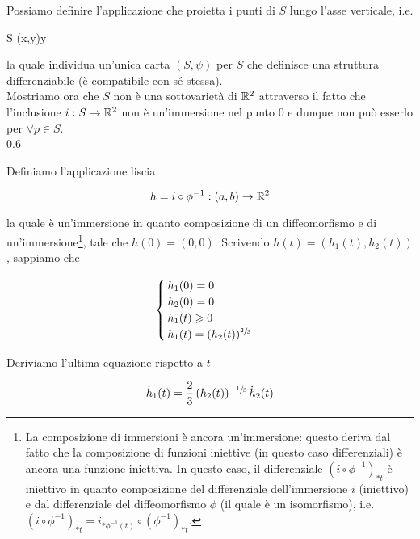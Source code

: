Possiamo definire l'applicazione che proietta i punti di $ S $ lungo l'asse verticale, i.e.

\map{\psi}
	{S}{\R}
	{(x,y)}{y}

la quale individua un'unica carta $ (S,\psi) $ per $ S $ che definisce una struttura differenziabile (è compatibile con sé stessa).\\
Mostriamo ora che $ S $ non è una sottovarietà di $ \mathbb{R}^{2} $ attraverso il fatto che l'inclusione $ i : S \to \mathbb{R}^{2} $ non è un'immersione nel punto 0 e dunque non può esserlo per $ \forall p \in S $.\\

	{0.6}{%
			}

Definiamo l'applicazione liscia

\begin{equation}
	h = i \circ \phi^{-1} : (a,b) \to \mathbb{R}^{2}
\end{equation}

la quale è un'immersione in quanto composizione di un diffeomorfismo e di un'immersione\footnote{%
	La composizione di immersioni è ancora un'immersione: questo deriva dal fatto che la composizione di funzioni iniettive (in questo caso differenziali) è ancora una funzione iniettiva. In questo caso, il differenziale $ (i \circ \phi^{-1})_{*t} $ è iniettivo in quanto composizione del differenziale dell'immersione $ i $ (iniettivo) e dal differenziale del diffeomorfismo $ \phi $ (il quale è un isomorfismo), i.e. $ (i \circ \phi^{-1})_{*t} = i_{*\phi^{-1}(t)} \circ (\phi^{-1})_{*t} $.%
}, tale che $ h(0)=(0,0) $. Scrivendo $ h(t) = (h_{1}(t),h_{2}(t)) $, sappiamo che

\begin{equation}
	\begin{cases}
		h_{1}(0) = 0\\
		h_{2}(0) = 0\\
		h_{1}(t) \geqslant 0\\
		h_{1}(t) = (h_{2}(t))^{\sfrac{2}{3}}
	\end{cases}
\end{equation}

Deriviamo l'ultima equazione rispetto a $ t $

\begin{equation}
	\dot{h}_{1}(t) = \dfrac{2}{3} \, (h_{2}(t))^{-\sfrac{1}{3}} \, \dot{h}_{2}(t)
\end{equation}

